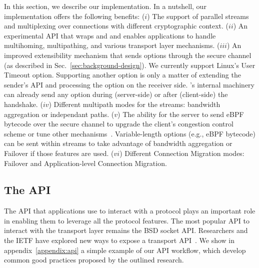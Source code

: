 \label{sec:content}
In this section, we describe our \tcpls implementation.  In a nutshell, our implementation offers the following benefits:
($i$) The support of parallel streams and multiplexing over \tcp connections
  with different cryptographic context.
($ii$) An experimental API that wraps \tls and \tcp and enables applications to
    handle multihoming, multipathing, and various transport layer mechanisms.
($iii$) An improved \tcp extensibility mechanism that sends \tcp options
   through the secure \tcpls channel (as described in
   Sec.~\ref{sec:background-design}). We currently support Linux's \tcp User Timeout
   option. Supporting another \tcp option is only a matter of extending the
   sender's API and processing the option on the receiver side. \tcpls's
   internal machinery can already send any \tcp option during (server-side) or
   after (client-side) the handshake.
($iv$) Different multipath modes for the \tcpls streams: bandwidth aggregation or
independant paths.
($v$) The ability for the server to send eBPF bytecode over the secure
  channel to upgrade the client's \tcp congestion control scheme or
  tune other \tcp mechanisms~\cite{brakmo2017tcp, tran2019beyond}.
  Variable-length options (e.g., eBPF bytecode) can be sent within streams to
  take advantage of bandwidth aggregation or Failover if those features are
  used.
($vi$) Different Connection Migration modes: Failover and Application-level
Connection Migration.



\subsection{The \tcpls API}

The API that applications use to interact with a protocol plays an important
role in enabling them to leverage all the protocol features. The most popular
API to interact with the transport layer remains the BSD socket API. Researchers
and the IETF have explored new ways to expose a transport
API~\cite{draft-ietf-taps-arch,hruby2014sockets,rfc6458,hesmans2016enhanced,schmidt2013socket}.
We show in appendix~\ref{appendix:api} a simple example of our API workflow,
which develop common good practices proposed by the outlined research.

